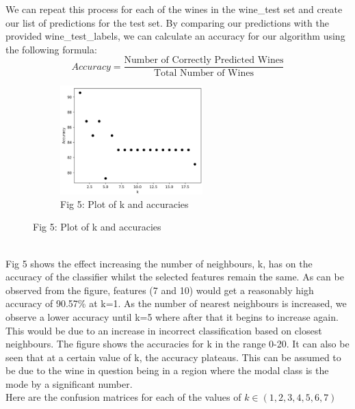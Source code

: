 \documentclass[10pt]{article}
\begin{document}
\noindent
We can repeat this process for each of the wines in the wine\_test set and create our list of predictions for the test set. By comparing our predictions with the provided wine\_test\_labels, we can calculate an accuracy for our algorithm using the following formula:
$$Accuracy = \frac{\text{Number of Correctly Predicted Wines}}{\text{Total Number of Wines}}$$
\begin{figure}[h!]
\captionsetup[subfigure]{labelformat=empty}
\begin{subfigure}{\textwidth}
\captionsetup[figure]{labelformat=empty}
\centering
\includegraphics[height=4.2cm]{accuracies.png}
\caption{Fig 5: Plot of k and accuracies}
\end{subfigure}%
\end{figure}
\\
\noindent
Fig 5 shows the effect increasing the number of neighbours, k, has on the accuracy of the classifier whilst the selected features remain the same. As can be observed from the figure, features (7 and 10) would get a reasonably high accuracy of 90.57\% at k=1. As the number of nearest neighbours is increased, we observe a lower accuracy until k=5 where after that it begins to increase again. This would be due to an increase in incorrect classification based on closest neighbours. The figure shows the accuracies for k in the range 0-20. It can also be seen that at a certain value of k, the accuracy plateaus. This can be assumed to be due to the wine in question being in a region where the modal class is the mode by a significant number.\\

\noindent
Here are the confusion matrices for each of the values of $k \in (1,2,3,4,5,6,7)$
\end{document}
